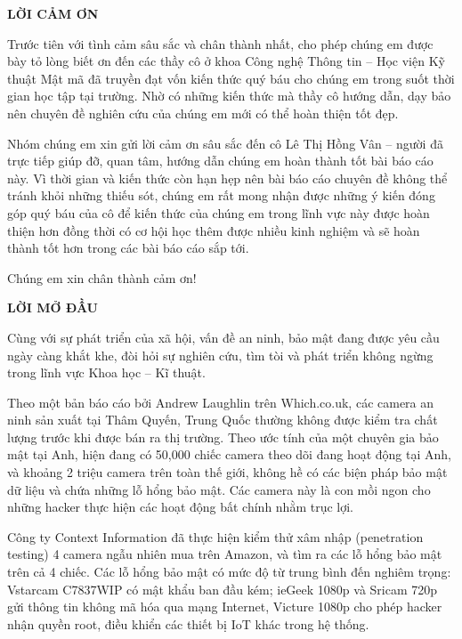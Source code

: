 \documentclass{article}
\begin{document}
\begin{center}
\textbf{\Large{LỜI CẢM ƠN}}
\end{center}

Trước tiên với tình cảm sâu sắc và chân thành nhất, cho phép chúng em được bày tỏ lòng biết ơn đến các thầy cô ở khoa Công nghệ Thông tin – Học viện Kỹ thuật Mật mã đã truyền đạt vốn kiến thức quý báu cho chúng em trong suốt thời gian học tập tại trường. Nhờ có những kiến thức mà thầy cô hướng dẫn, dạy bảo nên chuyên đề nghiên cứu của chúng em mới có thể hoàn thiện tốt đẹp.

Nhóm chúng em xin gửi lời cảm ơn sâu sắc đến cô Lê Thị Hồng Vân – người đã trực tiếp giúp đỡ, quan tâm, hướng dẫn chúng em hoàn thành tốt bài báo cáo này. Vì thời gian và kiến thức còn hạn hẹp nên bài báo cáo chuyên đề không thể tránh khỏi những thiếu sót, chúng em rất mong nhận được những ý kiến đóng góp quý báu của cô để kiến thức của chúng em trong lĩnh vực này được hoàn thiện hơn đồng thời có cơ hội học thêm được nhiều kinh nghiệm và sẽ hoàn thành tốt hơn trong các bài báo cáo sắp tới.

Chúng em xin chân thành cảm ơn!

\newpage

\begin{center}
\textbf{\Large{LỜI MỞ ĐẦU}}
\end{center}


Cùng với sự phát triển của xã hội, vấn đề an ninh, bảo mật đang được yêu cầu ngày càng khắt khe, đòi hỏi sự nghiên cứu, tìm tòi và phát triển không ngừng trong lĩnh vực Khoa học – Kĩ thuật.

Theo một bản báo cáo bởi Andrew Laughlin trên Which.co.uk, các camera an ninh sản xuất tại Thâm Quyến, Trung Quốc thường không được kiểm tra chất lượng trước khi được bán ra thị trường. Theo ước tính của một chuyên gia bảo mật tại Anh, hiện đang có 50,000 chiếc camera theo dõi đang hoạt động tại Anh, và khoảng 2 triệu camera trên toàn thế giới, không hề có các biện pháp bảo mật dữ liệu và chứa những lỗ hổng bảo mật. Các camera này là con mồi ngon cho những hacker thực hiện các hoạt động bất chính nhằm trục lợi.

Công ty Context Information đã thực hiện kiểm thử xâm nhập (penetration testing) 4 camera ngẫu nhiên mua trên Amazon, và tìm ra các lỗ hổng bảo mật trên cả 4 chiếc. Các lỗ hổng bảo mật có mức độ từ trung bình đến nghiêm trọng: Vstarcam C7837WIP có mật khẩu ban đầu kém; ieGeek 1080p và Sricam 720p gửi thông tin không mã hóa qua mạng Internet, Victure 1080p cho phép hacker nhận quyền root, điều khiển các thiết bị IoT khác trong hệ thống.
\end{document}
